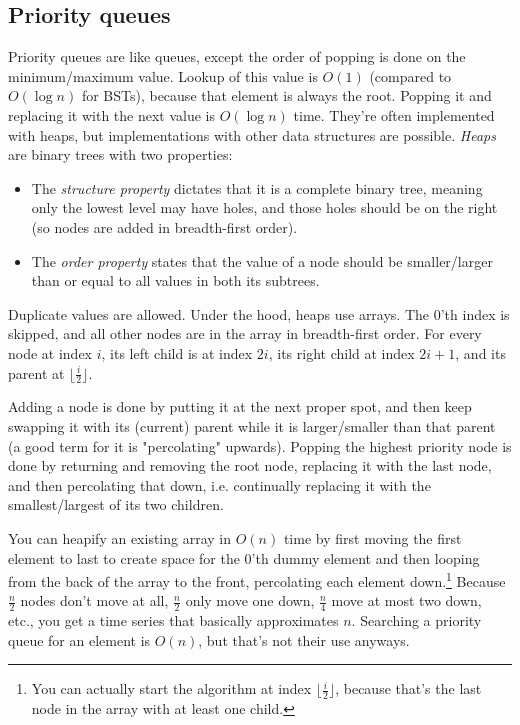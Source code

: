 \documentclass[8pt, table, xcdraw]{article}%
\begin{document}
\subsection{Priority queues}

Priority queues are like queues, except the order of popping is done on the minimum/maximum value. Lookup of this value is $O(1)$ (compared to $O(\log n)$ for BSTs), because that element is always the root. Popping it and replacing it with the next value is $O(\log n)$ time. They're often implemented with heaps, but implementations with other data structures are possible. \emph{Heaps} are binary trees with two properties:

\begin{itemize}
    \item The \emph{structure property} dictates that it is a complete binary tree, meaning only the lowest level may have holes, and those holes should be on the right (so nodes are added in breadth-first order).
    \item The \emph{order property} states that the value of a node should be smaller/larger than or equal to all values in both its subtrees.
\end{itemize}

Duplicate values are allowed. Under the hood, heaps use arrays. The $0$'th index is skipped, and all other nodes are in the array in breadth-first order. For every node at index $i$, its left child is at index $2i$, its right child at index $2i+1$, and its parent at $\lfloor \frac{i}{2}\rfloor$.

Adding a node is done by putting it at the next proper spot, and then keep swapping it with its (current) parent while it is larger/smaller than that parent (a good term for it is "percolating" upwards). Popping the highest priority node is done by returning and removing the root node, replacing it with the last node, and then percolating that down, i.e. continually replacing it with the smallest/largest of its two children.

You can heapify an existing array in $O(n)$ time by first moving the first element to last to create space for the 0'th dummy element and then looping from the back of the array to the front, percolating each element down.\footnote{You can actually start the algorithm at index $\lfloor \frac{i}{2}\rfloor$, because that's the last node in the array with at least one child.} Because $\frac{n}{2}$ nodes don't move at all, $\frac{n}{2}$ only move one down, $\frac{n}{4}$ move at most two down, etc., you get a time series that basically approximates $n$.
Searching a priority queue for an element is $O(n)$, but that's not their use anyways.
\end{document}
